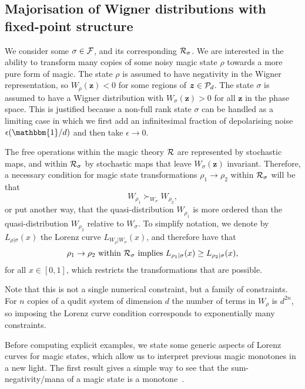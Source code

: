 \documentclass[
onecolumn,
superscriptaddress
]{revtex4-1}
\newcommand{\revhigh}[1]{{\color{red}#1}}
\def\id{\mathbbm{1}}
\def\z{\boldsymbol{z}}
\def\R{{\cal R}}
\def\F{{\cal F}}
\renewcommand{\P}{{\cal P}}
\begin{document}
\subsection*{Majorisation of Wigner distributions with fixed-point structure}

We consider some $\sigma \in \F$, and its corresponding $\R_\sigma$. We are interested in the ability to transform many copies of some noisy magic state $\rho$ towards a more pure form of magic. The state $\rho$ is assumed to have negativity in the Wigner representation, so $W_\rho(\z) < 0$ for some regions of $\z \in \P_d$. The state $\sigma$ is assumed to have a Wigner distribution with $W_\sigma(\z) > 0$ for all $\z$ in the phase space.
\revhigh{This is justified because a non-full rank state $\sigma$ can be handled as a limiting case in which we first add an infinitesimal fraction of depolarising noise $\epsilon (\id/d)$ and then take $\epsilon \rightarrow 0$.}

The free operations within the magic theory $\R$ are represented by stochastic maps, and within $\R_\sigma$ by stochastic maps that leave $W_\sigma(\z)$ invariant. Therefore, a necessary condition for magic state transformations $\rho_1 \rightarrow \rho_2$ within $\R_\sigma$ will be that 
\begin{equation}
	W_{\rho_1} \succ_{W_{\sigma}} W_{\rho_2},
\end{equation}
or put another way, that the quasi-distribution $W_{\rho_1}$ is more ordered than the quasi-distribution $W_{\rho_2}$ relative to $W_\sigma$. To simplify notation, we denote by $L_{\rho | \sigma}(x)$ the Lorenz curve $L_{W_{\rho} | W_{\sigma}} (x)$, and therefore have that
\begin{equation}
\rho_1 \rightarrow \rho_2 \mbox{ within }\R_\sigma \mbox{ implies } L_{\rho_1 |\sigma} (x) \ge L_{\rho_2 |\sigma} (x),
\end{equation}
for all $x \in [0,1]$, which restricts the transformations that are possible.

Note that this is not a single numerical constraint, but a family of constraints. For $n$ copies of a qudit system of dimension $d$ the number of terms in $W_{\rho}$ is $d^{2n}$, so imposing the Lorenz curve condition corresponds to exponentially many constraints.

\revhigh{Before computing explicit examples,} we state some generic aspects of Lorenz curves for magic states, which allow us to interpret previous magic monotones in a new light. The first result gives a simple way to see that the sum-negativity/mana of a magic state is a monotone~\cite{cit:veitch2}.
\end{document}
